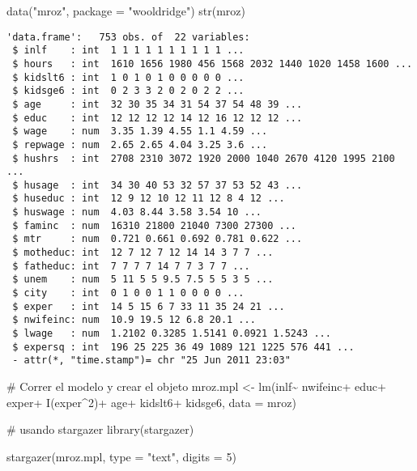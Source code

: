\documentclass[
  letterpaper,
  DIV=11,
  numbers=noendperiod]{scrreprt}
\newenvironment{Shaded}{\begin{snugshade}}{\end{snugshade}}
\newcommand{\AttributeTok}[1]{\textcolor[rgb]{0.40,0.45,0.13}{#1}}
\newcommand{\CommentTok}[1]{\textcolor[rgb]{0.37,0.37,0.37}{#1}}
\newcommand{\DecValTok}[1]{\textcolor[rgb]{0.68,0.00,0.00}{#1}}
\newcommand{\FunctionTok}[1]{\textcolor[rgb]{0.28,0.35,0.67}{#1}}
\newcommand{\NormalTok}[1]{\textcolor[rgb]{0.00,0.23,0.31}{#1}}
\newcommand{\OtherTok}[1]{\textcolor[rgb]{0.00,0.23,0.31}{#1}}
\newcommand{\SpecialCharTok}[1]{\textcolor[rgb]{0.37,0.37,0.37}{#1}}
\newcommand{\StringTok}[1]{\textcolor[rgb]{0.13,0.47,0.30}{#1}}
\begin{document}
\begin{Shaded}
\begin{Highlighting}[]
\FunctionTok{data}\NormalTok{(}\StringTok{"mroz"}\NormalTok{, }\AttributeTok{package =} \StringTok{"wooldridge"}\NormalTok{)}
\FunctionTok{str}\NormalTok{(mroz)}
\end{Highlighting}
\end{Shaded}

\begin{verbatim}
'data.frame':   753 obs. of  22 variables:
 $ inlf    : int  1 1 1 1 1 1 1 1 1 1 ...
 $ hours   : int  1610 1656 1980 456 1568 2032 1440 1020 1458 1600 ...
 $ kidslt6 : int  1 0 1 0 1 0 0 0 0 0 ...
 $ kidsge6 : int  0 2 3 3 2 0 2 0 2 2 ...
 $ age     : int  32 30 35 34 31 54 37 54 48 39 ...
 $ educ    : int  12 12 12 12 14 12 16 12 12 12 ...
 $ wage    : num  3.35 1.39 4.55 1.1 4.59 ...
 $ repwage : num  2.65 2.65 4.04 3.25 3.6 ...
 $ hushrs  : int  2708 2310 3072 1920 2000 1040 2670 4120 1995 2100 ...
 $ husage  : int  34 30 40 53 32 57 37 53 52 43 ...
 $ huseduc : int  12 9 12 10 12 11 12 8 4 12 ...
 $ huswage : num  4.03 8.44 3.58 3.54 10 ...
 $ faminc  : num  16310 21800 21040 7300 27300 ...
 $ mtr     : num  0.721 0.661 0.692 0.781 0.622 ...
 $ motheduc: int  12 7 12 7 12 14 14 3 7 7 ...
 $ fatheduc: int  7 7 7 7 14 7 7 3 7 7 ...
 $ unem    : num  5 11 5 5 9.5 7.5 5 5 3 5 ...
 $ city    : int  0 1 0 0 1 1 0 0 0 0 ...
 $ exper   : int  14 5 15 6 7 33 11 35 24 21 ...
 $ nwifeinc: num  10.9 19.5 12 6.8 20.1 ...
 $ lwage   : num  1.2102 0.3285 1.5141 0.0921 1.5243 ...
 $ expersq : int  196 25 225 36 49 1089 121 1225 576 441 ...
 - attr(*, "time.stamp")= chr "25 Jun 2011 23:03"
\end{verbatim}

\begin{Shaded}
\begin{Highlighting}[]
\CommentTok{\# Correr el modelo y crear el objeto}
\NormalTok{mroz.mpl }\OtherTok{\textless{}{-}} \FunctionTok{lm}\NormalTok{(inlf}\SpecialCharTok{\textasciitilde{}}
\NormalTok{                 nwifeinc}\SpecialCharTok{+}
\NormalTok{                 educ}\SpecialCharTok{+}
\NormalTok{                 exper}\SpecialCharTok{+}
                 \FunctionTok{I}\NormalTok{(exper}\SpecialCharTok{\^{}}\DecValTok{2}\NormalTok{)}\SpecialCharTok{+}
\NormalTok{                 age}\SpecialCharTok{+}
\NormalTok{                 kidslt6}\SpecialCharTok{+}
\NormalTok{                 kidsge6,}
               \AttributeTok{data =}\NormalTok{ mroz)}


\CommentTok{\# usando stargazer}
\FunctionTok{library}\NormalTok{(stargazer)}

\FunctionTok{stargazer}\NormalTok{(mroz.mpl,}
          \AttributeTok{type =} \StringTok{"text"}\NormalTok{, }
          \AttributeTok{digits =} \DecValTok{5}\NormalTok{)}
\end{Highlighting}
\end{Shaded}
\end{document}
